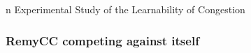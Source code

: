 \documentclass[svgnames]{beamer}
\begin{document}
\begin{frame}
n Experimental Study of the Learnability of Congestion

\end{frame}

\begin{frame}
\frametitle{RemyCC competing against itself}

\begin{centering}

\noindent {}

\end{centering}

\end{frame}
\end{document}
